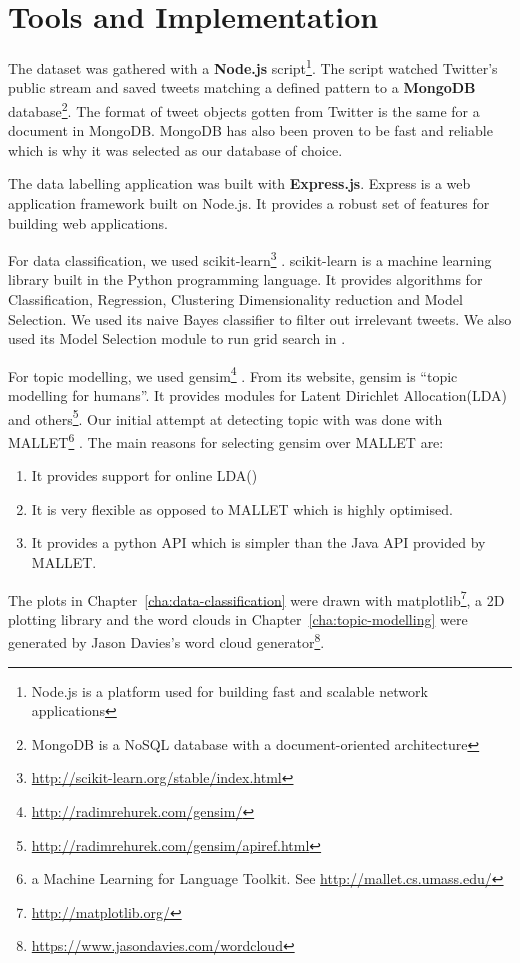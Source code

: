 \chapter{Tools and Implementation}
\label{cha:tools-and-implementation}

The dataset was gathered with a \textbf{Node.js} script\footnote{Node.js is a platform used for
building fast and scalable network applications}. The script watched Twitter's public stream and
saved tweets matching a defined pattern to a \textbf{MongoDB} database\footnote{MongoDB is a NoSQL
database with a document-oriented architecture}. The format of tweet objects gotten from Twitter
is the same for a document in MongoDB\@. MongoDB has also been proven to be fast and reliable
which is why it was selected as our database of choice.

The data labelling application was built with \textbf{Express.js}. Express is a web application
framework built on Node.js. It provides a robust set of features for building web applications.

For data classification, we used
scikit-learn\footnote{\url{http://scikit-learn.org/stable/index.html}} \citep{scikit-learn}.
scikit-learn is a machine learning library built in the Python programming language. It provides
algorithms for Classification, Regression, Clustering Dimensionality reduction and Model Selection.
We used its naive Bayes classifier to filter out irrelevant tweets. We also used its Model Selection
module to run grid search in .

For topic modelling, we used gensim\footnote{\url{http://radimrehurek.com/gensim/}}
\citep{rehurek_lrec}. From its website, gensim is ``topic modelling for humans''. It provides
modules for Latent Dirichlet Allocation(LDA) and
others\footnote{\url{http://radimrehurek.com/gensim/apiref.html}}. Our initial attempt at detecting
topic with was done with MALLET\footnote{a Machine Learning for Language Toolkit. See
\url{http://mallet.cs.umass.edu/}} \citep{McCallumMALLET}. The main reasons for selecting gensim
over MALLET are:
\begin{enumerate}
  \item It provides support for online LDA()
  \item It is very flexible as opposed to MALLET which is highly optimised.
  \item It provides a python API which is simpler than the Java API provided by MALLET.
\end{enumerate}

The plots in Chapter~\ref{cha:data-classification} were drawn with
matplotlib\footnote{\url{http://matplotlib.org/}}, a 2D plotting library \citep{hunter-2007} and the
word clouds in Chapter~\ref{cha:topic-modelling} were generated by Jason Davies's word cloud
generator\footnote{\url{https://www.jasondavies.com/wordcloud}}.

